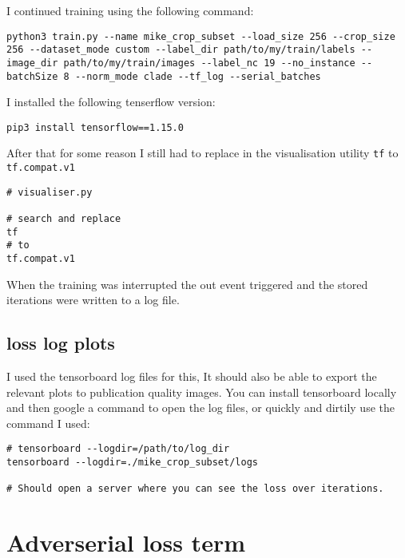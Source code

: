 \documentclass{memoir}
\begin{document}
I continued training using the following command:

\begin{verbatim}
python3 train.py --name mike_crop_subset --load_size 256 --crop_size 256 --dataset_mode custom --label_dir path/to/my/train/labels --image_dir path/to/my/train/images --label_nc 19 --no_instance --batchSize 8 --norm_mode clade --tf_log --serial_batches
\end{verbatim}

I installed the following tenserflow version:

\begin{verbatim}
pip3 install tensorflow==1.15.0
\end{verbatim}

After that for some reason I still had to replace in the visualisation utility \texttt{tf} to \texttt{tf.compat.v1}

\begin{verbatim}
# visualiser.py

# search and replace
tf
# to
tf.compat.v1
\end{verbatim}

When the training was interrupted the out event triggered and the stored iterations were written to a log file.

\section{loss log plots}
\label{sec:orgb0c3c84}

I used the tensorboard log files for this, It should also be able to export the
relevant plots to publication quality images. You can install tensorboard
locally and then google a command to open the log files, or quickly and dirtily
use the command I used:

\begin{verbatim}
# tensorboard --logdir=/path/to/log_dir
tensorboard --logdir=./mike_crop_subset/logs

# Should open a server where you can see the loss over iterations.
\end{verbatim}


\chapter{Adverserial loss term}
\label{sec:orgc1ed30b}
\end{document}
